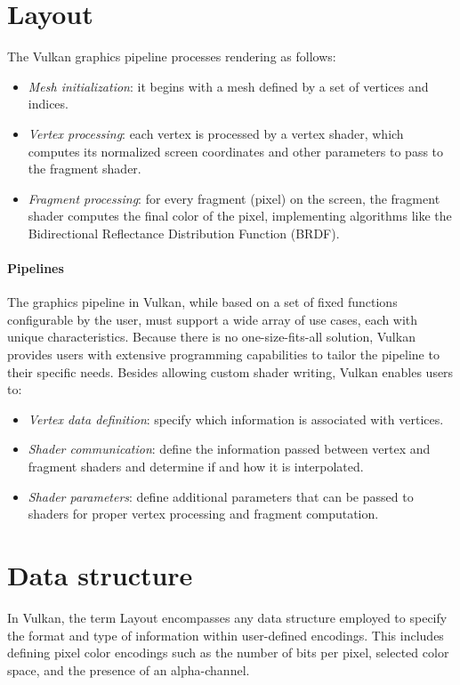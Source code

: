 \section{Layout}

The Vulkan graphics pipeline processes rendering as follows:
\begin{itemize}
    \item \textit{Mesh initialization}: it begins with a mesh defined by a set of vertices and indices.
    \item \textit{Vertex processing}: each vertex is processed by a vertex shader, which computes its normalized screen coordinates and other parameters to pass to the fragment shader.
    \item \textit{Fragment processing}: for every fragment (pixel) on the screen, the fragment shader computes the final color of the pixel, implementing algorithms like the Bidirectional Reflectance Distribution Function (BRDF).
\end{itemize}


\paragraph*{Pipelines}
The graphics pipeline in Vulkan, while based on a set of fixed functions configurable by the user, must support a wide array of use cases, each with unique characteristics. 
Because there is no one-size-fits-all solution, Vulkan provides users with extensive programming capabilities to tailor the pipeline to their specific needs.
Besides allowing custom shader writing, Vulkan enables users to:
\begin{itemize}
    \item \textit{Vertex data definition}: specify which information is associated with vertices.
    \item \textit{Shader communication}: define the information passed between vertex and fragment shaders and determine if and how it is interpolated.
    \item \textit{Shader parameters}: define additional parameters that can be passed to shaders for proper vertex processing and fragment computation.
\end{itemize}

\section{Data structure}
In Vulkan, the term Layout encompasses any data structure employed to specify the format and type of information within user-defined encodings. 
This includes defining pixel color encodings such as the number of bits per pixel, selected color space, and the presence of an alpha-channel.

